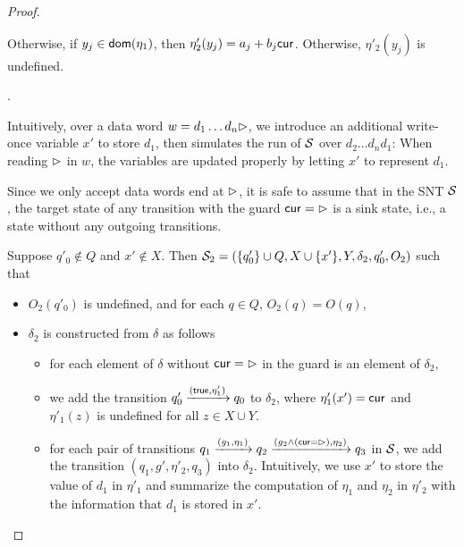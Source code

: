 \begin{appendix}
\begin{proof}
\begin{itemize}
\begin{itemize}
\begin{itemize}
{%
Otherwise, if $y_j \in \mathsf{dom}(\eta_1)$, then $\eta'_2(y_j)= a_{j} + b_{j} \mathsf{cur}$. Otherwise, $\eta'_2(y_j)$ is undefined.}
\end{itemize}
\end{itemize}
\end{itemize}

\smallskip

.

Intuitively, over a data word $w=d_1\dots d_n\rhd$, we introduce an additional write-once variable $x'$ to store $d_1$, then simulates the run of ${\mathcal{S} }$ over $d_2\dots d_n d_1$: When reading $\rhd$ in $w$, the variables are updated properly by letting $x'$ to represent $d_1$.

Since we only accept data words end at $\rhd$, it is safe to assume that in the SNT ${\mathcal{S} }$, the target state of any transition with the guard $\mathsf{cur} = \rhd$ is a sink state, i.e., a state without any outgoing transitions.


Suppose $q'_{0} \not \in Q$ and $x' \not \in X$. Then ${\mathcal{S} }_2 = (\{q'_0\} \cup Q, X\cup\{x'\}, Y, \delta_2, q'_{0}, O_2)$ such that  
\begin{itemize}
\item $O_2(q'_0)$ is undefined, and for each $q \in Q$, $O_2(q)=O(q)$,	
	
\item $\delta_2$ is constructed from $\delta$ as follows
	\begin{itemize}
	\item for each element of $\delta$ without $\mathsf{cur} = \rhd$ in the guard is an element of $\delta_2$,

	\item we add the transition $q'_0 \xrightarrow{(\mathsf{true},\eta'_1)} q_0$ to $\delta_2$, where $\eta'_1(x') =\mathsf{cur}$ and $\eta'_1(z)$ is undefined for all $z \in X\cup Y$.

	\item for each pair of transitions $q_1 \xrightarrow{(g_1,\eta_1)} q_2 \xrightarrow{(g_2\wedge(\mathsf{cur}=\rhd),\eta_2)} q_3$ in ${\mathcal{S} }$, we add the transition $(q_1, g', \eta'_2, q_3)$ into $\delta_2$. Intuitively, we use $x'$ to store the value of $d_1$ in $ \eta'_1$ and summarize the computation of $\eta_1$ and $\eta_2$ in $\eta'_2$ with the information that $d_1$ is stored in $x'$.



\end{itemize}
\end{itemize}
\end{proof}
\end{appendix}
